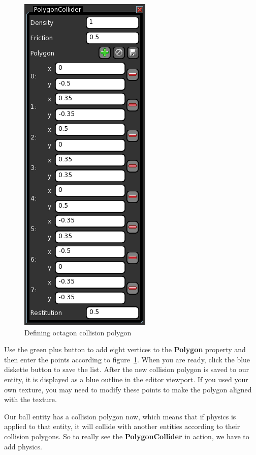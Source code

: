 \documentclass[a4paper,12pt]{article}
\begin{document}
\begin{figure}
\capstart
\begin{center}
  \includegraphics[scale=0.65]{PolygonCollider}
 \end{center}
 \caption{Defining octagon collision polygon}
 \label{fig:polygon_collider}
\end{figure}

Use the green plus button to add eight vertices to the \textbf{Polygon} property and then enter the points according to figure~\ref{fig:polygon_collider}. When you are ready, click the blue diskette button to save the list. After the new collision polygon is saved to our entity, it is displayed as a blue outline in the editor viewport. If you used your own texture, you may need to modify these points to make the polygon aligned with the texture.

Our ball entity has a collision polygon now, which means that if physics is applied to that entity, it will collide with another entities according to their collision polygons. So to really see the \textbf{PolygonCollider} in action, we have to add physics.
\end{document}
